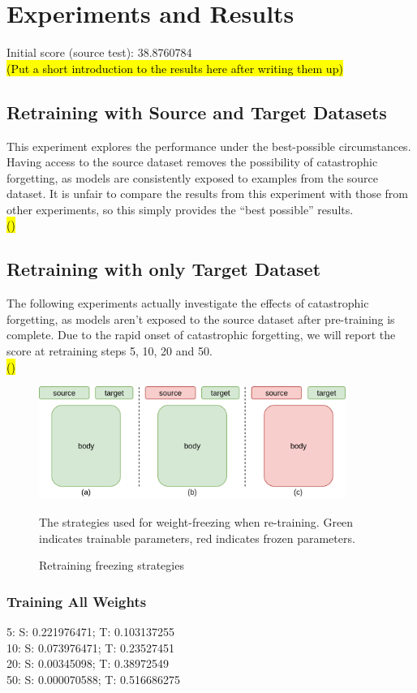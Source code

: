 \documentclass{report}
\newcommand{\TODO}[1]{\sethlcolor{pink}\hl{\\(#1)\\}}
\begin{document}
	\section{Experiments and Results}
	Initial score (source test): 38.8760784%
	\TODO{Put a short introduction to the results here after writing them up}
	
	\subsection{Retraining with Source and Target Datasets}
	This experiment explores the performance under the best-possible circumstances. Having access to the source dataset removes the possibility of catastrophic forgetting, as models are consistently exposed to examples from the source dataset. It is unfair to compare the results from this experiment with those from other experiments, so this simply provides the ``best possible'' results.
	\TODO{}
	
	\subsection{Retraining with only Target Dataset}
	The following experiments actually investigate the effects of catastrophic forgetting, as models aren't exposed to the source dataset after pre-training is complete. Due to the rapid onset of catastrophic forgetting, we will report the score at retraining steps 5, 10, 20 and 50.
	\TODO{}
	\begin{figure}[h]
		\centering
		\includegraphics[width=10cm]{freezing}
		\caption{Retraining freezing strategies}
		The strategies used for weight-freezing when re-training. Green indicates trainable parameters, red indicates frozen parameters.
		\label{fig:subsets:1}
	\end{figure}
	\subsubsection{Training All Weights}
	5: S: 0.221976471; T: 0.103137255\\
	10: S: 0.073976471; T: 0.23527451\\
	20: S: 0.00345098; T: 0.38972549\\
	50: S: 0.000070588; T: 0.516686275\\
	
\end{document}

